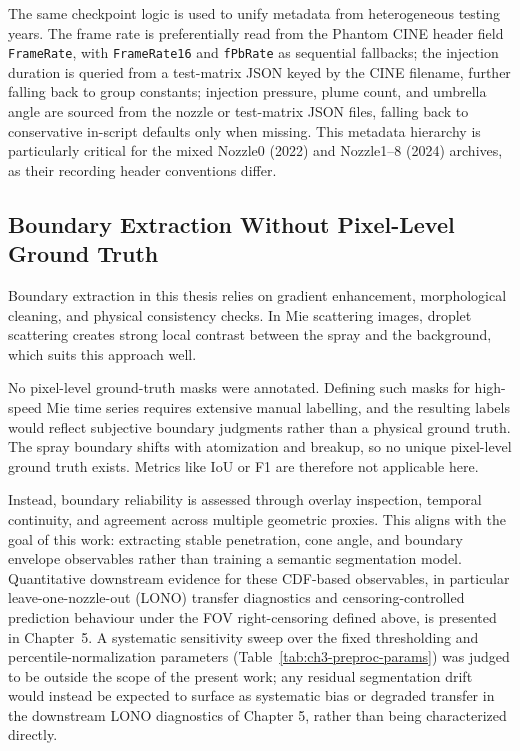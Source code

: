 The same checkpoint logic is used to unify metadata from heterogeneous testing years.
The frame rate is preferentially read from the Phantom CINE header field \texttt{FrameRate}, with \texttt{FrameRate16} and \texttt{fPbRate} as sequential fallbacks; the injection duration is queried from a test-matrix JSON keyed by the CINE filename, further falling back to group constants; injection pressure, plume count, and umbrella angle are sourced from the nozzle or test-matrix JSON files, falling back to conservative in-script defaults only when missing.
This metadata hierarchy is particularly critical for the mixed Nozzle0 (2022) and Nozzle1--8 (2024) archives, as their recording header conventions differ.




\subsection{Boundary Extraction Without Pixel-Level Ground Truth}

Boundary extraction in this thesis relies on gradient enhancement, morphological cleaning, and physical consistency checks. In Mie scattering images, droplet scattering creates strong local contrast between the spray and the background, which suits this approach well.

No pixel-level ground-truth masks were annotated. Defining such masks for high-speed Mie time series requires extensive manual labelling, and the resulting labels would reflect subjective boundary judgments rather than a physical ground truth. The spray boundary shifts with atomization and breakup, so no unique pixel-level ground truth exists. Metrics like IoU or F1 are therefore not applicable here.

Instead, boundary reliability is assessed through overlay inspection, temporal continuity, and agreement across multiple geometric proxies. This aligns with the goal of this work: extracting stable penetration, cone angle, and boundary envelope observables rather than training a semantic segmentation model.
Quantitative downstream evidence for these CDF-based observables, in particular leave-one-nozzle-out (LONO) transfer diagnostics and censoring-controlled prediction behaviour under the FOV right-censoring defined above, is presented in Chapter~5.
A systematic sensitivity sweep over the fixed thresholding and percentile-normalization parameters (Table~\ref{tab:ch3-preproc-params}) was judged to be outside the scope of the present work; any residual segmentation drift would instead be expected to surface as systematic bias or degraded transfer in the downstream LONO diagnostics of Chapter 5, rather than being characterized directly.


